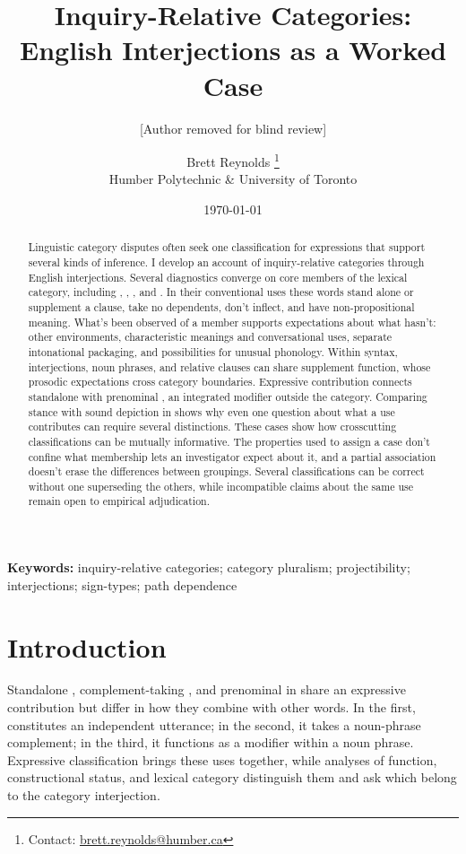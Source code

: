 \documentclass[12pt]{article}
\title{Inquiry-Relative Categories:\\English Interjections as a Worked Case}
\author{[Author removed for blind review]}
\author{Brett Reynolds \orcidlink{0000-0003-0073-7195}%
\thanks{Contact: \href{mailto:brett.reynolds@humber.ca}{brett.reynolds@humber.ca}}\\
Humber Polytechnic \& University of Toronto}
\date{\today}
\begin{document}
\maketitle

\begin{abstract}
Linguistic category disputes often seek one classification for expressions
that support several kinds of inference. I develop an account of
inquiry-relative categories through English interjections. Several
diagnostics converge on core members of the lexical category, including
, , , and . In
their conventional uses these words stand alone or supplement a clause,
take no dependents, don't inflect, and have non-propositional meaning. What's been observed of a member supports
expectations about what hasn't: other environments, characteristic meanings and conversational uses,
separate intonational packaging, and possibilities for unusual phonology.
Within syntax, interjections, noun phrases, and relative clauses can share
supplement function, whose prosodic expectations cross category
boundaries. Expressive contribution connects standalone 
with prenominal , an integrated modifier outside the category. Comparing
stance with sound depiction in  shows why even one question
about what a use contributes can require several distinctions.
These cases show how crosscutting classifications can be mutually
informative. The properties used to assign a case don't confine what
membership lets an investigator expect about it, and a partial association doesn't
erase the differences between groupings. Several classifications can
be correct without one superseding the others, while incompatible
claims about the same use remain open to empirical adjudication.
\end{abstract}

\noindent\textbf{Keywords:} inquiry-relative categories; category pluralism;
projectibility; interjections; sign-types; path dependence


\section{Introduction}\label{sec:intro}

Standalone , complement-taking ,
and prenominal  in  share an expressive
contribution but differ in how they combine with other words. In the first,
 constitutes an independent utterance; in the second, it
takes a noun-phrase complement; in the third, it functions as a modifier
within a noun phrase. Expressive classification brings these uses together,
while analyses of function, constructional status, and lexical category
distinguish them and ask
which belong to the category interjection.
\end{document}
